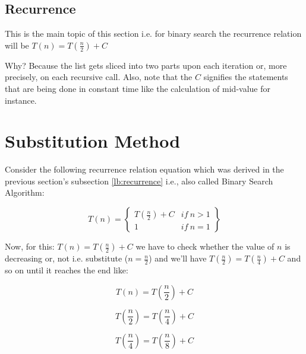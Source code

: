 \documentclass[a4paper,12pt]{article}
\theoremstyle{definition}
\begin{document}
    \subsection*{Recurrence}\label{lb:recurrence}

    \noindent
    This is the main topic of this section i.e. for binary search the recurrence relation will be
    $T(n) = T(\frac{n}{2}) + C$

    \noindent
    Why? Because the list gets sliced into two parts upon each iteration or, more precisely, on each recursive call.
    Also, note that the $C$ signifies the statements that are being done in constant time like the calculation
    of mid-value for instance.


    \section{Substitution Method}

    \noindent
    Consider the following recurrence relation equation which was derived in the previous section's
    subsection \ref{lb:recurrence} i.e., also called Binary Search Algorithm:

    \begin{equation*}
        \label{eq:recurrence_main}
        T(n) = \begin{Bmatrix}
                   T(\frac{n}{2}) + C & if\ n > 1 \\
                   1                  & if\ n = 1
        \end{Bmatrix}
    \end{equation*}

    \noindent
    Now, for this: $T(n) = T(\frac{n}{2}) + C$ we have to check whether the value of $n$ is decreasing or,
    not i.e. substitute ($n = \frac{n}{2}$) and we'll have $T(\frac{n}{2}) = T(\frac{n}{4}) + C$ and so on until
    it reaches the end like:

    \begin{equation}
        \label{eq:unsubtituted}
        T(n) = T\left(\frac{n}{2}\right) + C
    \end{equation}

    \begin{equation}
        \label{eq:firstsubstitution}
        T\left(\frac{n}{2}\right) = T\left(\frac{n}{4}\right) + C
    \end{equation}

    \begin{equation}
        \label{eq:secondsubstitution}
        T\left(\frac{n}{4}\right) = T\left(\frac{n}{8}\right) + C
    \end{equation}
\end{document}
